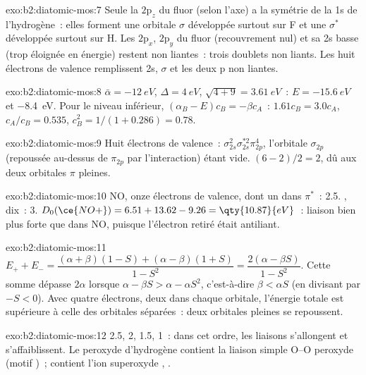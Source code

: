 \begin{solution}{exo:b2:diatomic-mos:7}
Seule la $2\mathrm p_z$ du fluor (selon l'axe) a la symétrie de la 1s de l'hydrogène~:
elles forment une orbitale $\sigma$ développée surtout sur F et une $\sigma^*$ développée surtout sur H. Les
$2\mathrm p_x$, $2\mathrm p_y$ du fluor (recouvrement nul) et sa 2s basse (trop éloignée en énergie)
restent non liantes~: trois doublets non liants. Les huit électrons de valence remplissent 2s, $\sigma$
et les deux p non liantes.
\end{solution}

\begin{solution}{exo:b2:diatomic-mos:8}
$\bar\alpha = \qty{-12}{eV}$, $\Delta = \qty{4}{eV}$, $\sqrt{4 + 9} = \qty{3.61}{eV}$~:
$E = \qty{-15.6}{eV}$ et \qty{-8.4}{eV}. Pour le niveau inférieur, $(\alpha_B - E)c_B = -\beta
c_A$~: $1.61c_B = 3.0c_A$, $c_A/c_B = 0.535$, $c_B^2 = 1/(1 + 0.286) = 0.78$.
\end{solution}

\begin{solution}{exo:b2:diatomic-mos:9}
Huit électrons de valence~: $\sigma_{2s}^2\sigma_{2s}^{*2}\pi_{2p}^4$, l'orbitale $\sigma_{2p}$
(repoussée au-dessus de $\pi_{2p}$ par l'interaction) étant vide.  $(6 - 2)/2 = 2$, dû aux
deux orbitales $\pi$ pleines.
\end{solution}

\begin{solution}{exo:b2:diatomic-mos:10}
NO, onze électrons de valence, dont un dans $\pi^*$~:  2.5. , dix~: 
3. $D_0(\ce{NO+}) = 6.51 + 13.62 - 9.26 = \qty{10.87}{eV}$~: liaison bien plus forte que dans NO, puisque
l'électron retiré était antiliant.
\end{solution}

\begin{solution}{exo:b2:diatomic-mos:11}
$E_+ + E_- = \dfrac{(\alpha + \beta)(1 - S) + (\alpha - \beta)(1 + S)}{1 - S^2} = \dfrac{2(\alpha -
\beta S)}{1 - S^2}$. Cette somme dépasse $2\alpha$ lorsque $\alpha - \beta S > \alpha - \alpha S^2$, c'est-à-dire
$\beta < \alpha S$ (en divisant par $-S < 0$). Avec quatre électrons, deux dans chaque orbitale, l'énergie
totale est supérieure à celle des orbitales séparées~: deux orbitales pleines se repoussent.
\end{solution}

\begin{solution}{exo:b2:diatomic-mos:12}
 2.5, 2, 1.5, 1~: dans cet ordre, les liaisons s'allongent et s'affaiblissent. Le peroxyde
d'hydrogène contient la liaison simple O--O peroxyde (motif )~;  contient
l'ion superoxyde , .
\end{solution}

